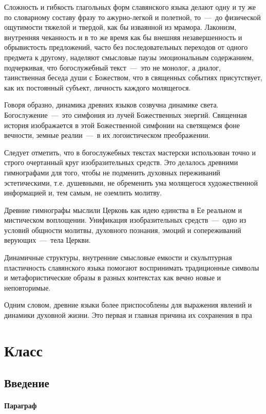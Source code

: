 \documentclass[11pt,a4paper]{memoir}
\begin{document}
    Сложность и гибкость глагольных форм славянского языка делают одну и ту же по словарному составу фразу то ажурно-легкой и полетной, то~---~до физической ощутимости тяжелой и твердой, как бы изваянной из мрамора. Лаконизм, внутренняя чеканность и в то же время как бы внешняя незавершенность и обрывистость предложений, часто без последовательных переходов от одного предмета к другому, наделяют смысловые паузы эмоциональным содержанием, подчеркивая, что богослужебный текст~---~это не монолог, а диалог, таинственная беседа души с Божеством, что в священных событиях присутствует, как их постоянный субъект, личность каждого молящегося.
    
    Говоря образно, динамика древних языков созвучна динамике света. Богослужение~---~это симфония из лучей Божественных энергий. Священная история изображается в этой Божественной симфонии на светящемся фоне вечности, земные реалии~---~в их логоистическом преображении.
    
    Следует отметить, что в богослужебных текстах мастерски использован точно и строго очертанный круг изобразительных средств. Это делалось древними гимнографами для того, чтобы не подменить духовных переживаний эстетическими, т.е. душевными, не обременить ума молящегося художественной информацией и, тем самым, не оземлить молитву.
    
    Древние гимнографы мыслили Церковь как идею единства в Ее реальном и мистическом воплощении. Унификация изобразительных средств~---~одно из условий общности молитвы, духовного познания, эмоций и сопереживаний верующих~---~тела Церкви.
    
    Динамичные структуры, внутренние смысловые емкости и скульптурная пластичность славянского языка помогают воспринимать традиционные символы и метафористические образы в разных контекстах как вечно новые и неповторимые.
    
    Одним словом, древние языки более приспособлены для выражения явлений и динамики духовной жизни. Это первая и главная причина их сохранения в пра
    
    \mainmatter
    
    \part{Класс}
    
    \chapter*{Введение}
            \subsection{Параграф}
\end{document}
